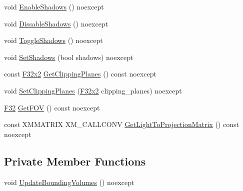 \begin{DoxyCompactItemize}
\item 
void \mbox{\hyperlink{classmage_1_1rendering_1_1_spot_light_ace198989b91c5b4ca590dabef5b88e25}{Enable\+Shadows}} () noexcept
\item 
void \mbox{\hyperlink{classmage_1_1rendering_1_1_spot_light_a11897283e223ed345a2d04738e7fc267}{Dissable\+Shadows}} () noexcept
\item 
void \mbox{\hyperlink{classmage_1_1rendering_1_1_spot_light_a4e6412e05d894a97409c23d8d088cabf}{Toggle\+Shadows}} () noexcept
\item 
void \mbox{\hyperlink{classmage_1_1rendering_1_1_spot_light_af1f1d3aee8bdcda50d16f4b0551e4728}{Set\+Shadows}} (bool shadows) noexcept
\item 
const \mbox{\hyperlink{namespacemage_aee4759dedc8def6c6dec26b5c7eddf29}{F32x2}} \mbox{\hyperlink{classmage_1_1rendering_1_1_spot_light_ae3149920d30b92433025fcd4bc8188e9}{Get\+Clipping\+Planes}} () const noexcept
\item 
void \mbox{\hyperlink{classmage_1_1rendering_1_1_spot_light_a9a4c2e827e91d7ec79118217376c9c6e}{Set\+Clipping\+Planes}} (\mbox{\hyperlink{namespacemage_aee4759dedc8def6c6dec26b5c7eddf29}{F32x2}} clipping\+\_\+planes) noexcept
\item 
\mbox{\hyperlink{namespacemage_aa97e833b45f06d60a0a9c4fc22ae02c0}{F32}} \mbox{\hyperlink{classmage_1_1rendering_1_1_spot_light_a22527d940bc7601285429b36e8d97490}{Get\+F\+OV}} () const noexcept
\item 
const X\+M\+M\+A\+T\+R\+IX X\+M\+\_\+\+C\+A\+L\+L\+C\+O\+NV \mbox{\hyperlink{classmage_1_1rendering_1_1_spot_light_ad617d1c098e2ca222a9736b8c45fa0c8}{Get\+Light\+To\+Projection\+Matrix}} () const noexcept
\end{DoxyCompactItemize}
\subsection*{Private Member Functions}
\begin{DoxyCompactItemize}
\item 
void \mbox{\hyperlink{classmage_1_1rendering_1_1_spot_light_aa225a105edf22a1a430a1c3aa42bc490}{Update\+Bounding\+Volumes}} () noexcept
\end{DoxyCompactItemize}
